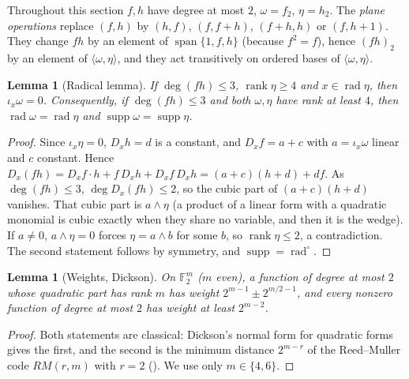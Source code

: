 \documentclass[11pt,a4paper]{article}
\theoremstyle{plain}
\newtheorem{lemma}[theorem]{Lemma}
\theoremstyle{remark}
\newcommand{\F}{\mathbb F_2}
\newcommand{\Span}{\operatorname{span}}
\newcommand{\supp}{\operatorname{supp}}
\newcommand{\rad}{\operatorname{rad}}
\newcommand{\rk}{\operatorname{rank}}
\begin{document}
Throughout this section $f,h$ have degree at most $2$, $\omega=f_2$, $\eta=h_2$. The \emph{plane operations} replace $(f,h)$ by $(h,f)$, $(f,f+h)$, $(f+h,h)$ or $(f,h+1)$. They change $fh$ by an element of $\Span\{1,f,h\}$ (because $f^2=f$), hence $(fh)_2$ by an element of $\langle\omega,\eta\rangle$, and they act transitively on ordered bases of $\langle\omega,\eta\rangle$.

\begin{lemma}[Radical lemma]\label{l3:lem:rad}
If $\deg(fh)\le3$, $\rk\eta\ge4$ and $x\in\rad\eta$, then $\iota_x\omega=0$. Consequently, if $\deg(fh)\le 3$ and both $\omega,\eta$ have rank at least $4$, then $\rad\omega=\rad\eta$ and $\supp\omega=\supp\eta$.
\end{lemma}

\begin{proof}
Since $\iota_x\eta=0$, $D_xh=d$ is a constant, and $D_xf=a+c$ with $a=\iota_x\omega$ linear and $c$ constant. Hence $D_x(fh)=D_xf\cdot h+f\,D_xh+D_xf\,D_xh=(a+c)(h+d)+d f$. As $\deg(fh)\le3$, $\deg D_x(fh)\le2$, so the cubic part of $(a+c)(h+d)$ vanishes. That cubic part is $a\wedge\eta$ (a product of a linear form with a quadratic monomial is cubic exactly when they share no variable, and then it is the wedge). If $a\ne0$, $a\wedge\eta=0$ forces $\eta=a\wedge b$ for some $b$, so $\rk\eta\le2$, a contradiction. The second statement follows by symmetry, and $\supp=\rad^{\circ}$.
\end{proof}

\begin{lemma}[Weights, Dickson]\label{l3:lem:wt}
On $\F^m$ ($m$ even), a function of degree at most $2$ whose quadratic part has rank $m$ has weight $2^{m-1}\pm2^{m/2-1}$, and every nonzero function of degree at most $2$ has weight at least $2^{m-2}$.
\end{lemma}

\begin{proof}
Both statements are classical: Dickson's normal form for quadratic forms gives the first, and the second is the minimum distance $2^{m-r}$ of the Reed--Muller code $RM(r,m)$ with $r=2$ (\cite[Ch.~13 and~15]{MS}). We use only $m\in\{4,6\}$.
\end{proof}
\end{document}
